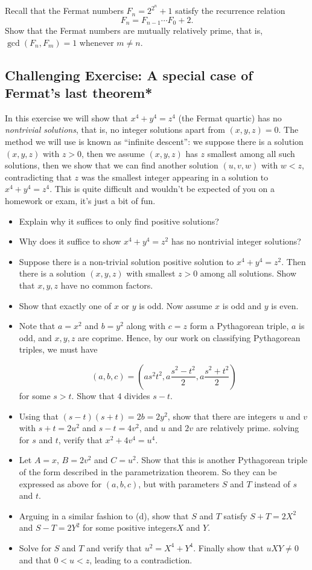 \documentclass[11pt,dvipsnames]{book}
\numberwithin{figure}{section} %
\numberwithin{table}{section} %
\begin{document}
\begin{exercise} Recall that the Fermat numbers $F_{n}=2^{2^{n}}+1$ satisfy the recurrence relation
\[
F_{n} = F_{n-1}\cdots F_{0}+2.
\]
Show that the Fermat numbers are mutually relatively prime, that is, $\gcd(F_{n},F_{m})=1$ whenever $m\neq n$.

\end{exercise}

\subsection{  Challenging Exercise: A special case of Fermat's last theorem*}

In this exercise we will show that $x^4 + y^4 = z^4$ (the Fermat quartic) has no {\it nontrivial solutions}, that is, no integer solutions apart from $(x,y,z)=0$. The method we will use is known as ``infinite descent'': we suppose there is a solution $(x,y,z)$ with $z>0$, then we assume $(x,y,z)$ has $z$ smallest among all such solutions, then we show that we can find another solution $(u,v,w)$ with $w<z$, contradicting that $z$ was the smallest integer appearing in a solution to $x^4+y^4=z^4$. This is quite difficult and wouldn't be expected of you on a homework or exam, it's just a bit of fun.
\begin{itemize}
\item Explain why it suffices to only find positive solutions?
\item Why does it suffice to show $x^4+y^4=z^2$ has no nontrivial integer solutions?
\item Suppose there is a non-trivial solution positive solution to  $x^4 + y^4 = z^2$. Then there is a solution $(x,y,z)$ with smallest $z>0$ among all solutions. Show that $x,y,z$ have no common factors.
\item Show that exactly one of $x$ or $y$ is odd. Now assume $x$ is odd and $y$ is even.
\item Note that $a=x^2$ and $b=y^2$ along with $c=z$ form a Pythagorean triple, $a$ is odd, and $x,y,z$ are coprime.  Hence, by our work on classifying Pythagorean triples, we must have

\[
(a,b,c) = \left( as^2 t^2, a\frac{s^2-t^2}{2}, a\frac{s^{2}+t^{2}}{2}\right)
\]
for some $s>t$. Show that $4$ divides $s-t$.
\item Using that $(s-t)(s+t)=2b=2y^2$, show that there are integers $u$ and $v$ with $s+t = 2u^2$ and $s-t=4v^2$, and $u$ and $2v$ are relatively prime. solving for $s$ and $t$, verify that $x^2+4v^4 = u^4$.
\item Let $A = x$, $B = 2v^2$ and $C = u^2$. Show that this is another Pythagorean triple of the form described in the parametrization theorem. So they can be expressed as above for $(a,b,c)$, but with parameters $S$ and $T$ instead of $s$ and $t$.
\item Arguing in a similar fashion to (d), show that $S$ and $T$ satisfy $S+T = 2X^2$ and $S-T=2Y^2$ for some positive integers$ X$ and $Y$.
\item Solve for $S$ and $T$ and verify that $u^2 = X^4 + Y^4$. Finally show that $uXY\neq 0$ and that $0 < u < z$, leading to a contradiction.
\end{itemize}
\end{document}
